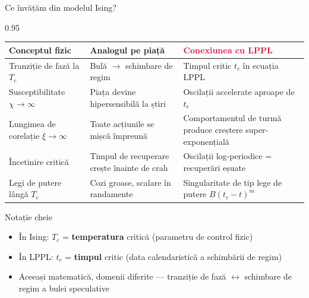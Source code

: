 \documentclass[9pt, aspectratio=169, t]{beamer}
\begin{document}
\begin{frame}{Ce învățăm din modelul Ising?}
    \begin{cminipage}{0.95\textwidth}
    {\scriptsize
    \begin{center}
    \renewcommand{\arraystretch}{1.4}
    \begin{tabular}{>{\raggedright\arraybackslash}p{3.2cm} >{\raggedright\arraybackslash}p{4.0cm} >{\raggedright\arraybackslash}p{4.0cm}}
        \toprule
        \textbf{\textcolor{MainBlue}{Conceptul fizic}} & \textbf{\textcolor{Forest}{Analogul pe piață}} & \textbf{\textcolor{Crimson}{Conexiunea cu LPPL}} \\
        \midrule
        Tranziție de fază la $T_c$ & Bulă $\to$ schimbare de regim & Timpul critic $t_c$ în ecuația LPPL \\
        Susceptibilitate $\chi \to \infty$ & Piața devine hipersensibilă la știri & Oscilații accelerate aproape de $t_c$ \\
        Lungimea de corelație $\xi \to \infty$ & Toate acțiunile se mișcă împreună & Comportamentul de turmă produce creștere super-exponențială \\
        Încetinire critică & Timpul de recuperare crește înainte de crah & Oscilații log-periodice = recuperări eșuate \\
        Legi de putere lângă $T_c$ & Cozi groase, scalare în randamente & Singularitate de tip lege de putere $B(t_c - t)^m$ \\
        \bottomrule
    \end{tabular}
    \end{center}
    }
    \vspace{2mm}
    {\footnotesize
    \begin{alertblock}{Notație cheie}
        \begin{itemize}\setlength{\itemsep}{0pt}
            \item În Ising: $T_c$ = \textbf{temperatura} critică (parametru de control fizic)
            \item În LPPL: $t_c$ = \textbf{timpul} critic (data calendaristică a schimbării de regim)
            \item Aceeași matematică, domenii diferite --- tranziție de fază $\leftrightarrow$ schimbare de regim a bulei speculative
        \end{itemize}
    \end{alertblock}
    }
    \end{cminipage}
\end{frame}
\end{document}
